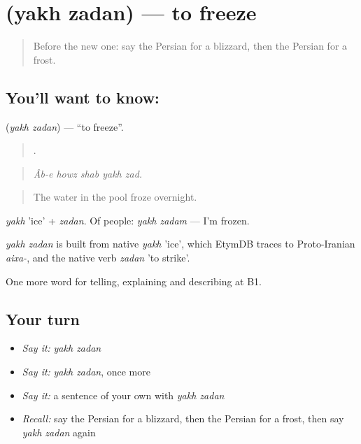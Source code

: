 \section[\texorpdfstring{\fa{یخ} \fa{زدن} (yakh zadan)}{یخ زدن (yakh zadan)}]{  (yakh zadan) — to freeze}

\label{lesson:FA-C476-yakh-zadan}



\begin{quote}
Before the new one: say the Persian for a blizzard, then the Persian for a frost.
\end{quote}

\subsection*{You'll want to know:  }
\textbf{ } (\emph{yakh zadan}) — \textquotedblleft{}to freeze\textquotedblright{}.

\begin{quote}
    .
\end{quote}

\begin{quote}
\emph{Âb-e howz shab yakh zad.}
\end{quote}

\begin{quote}
The water in the pool froze overnight.
\end{quote}

\emph{yakh} 'ice' + \emph{zadan}. Of people: \emph{yakh zadam} — I'm frozen.

\begin{cousinweb}
\emph{yakh zadan} is built from native \emph{yakh} 'ice', which EtymDB traces to Proto-Iranian \emph{aixa-}, and the native verb \emph{zadan} 'to strike'.
\end{cousinweb}

\begin{grammarlens}[title={What you've built}]
One more word for telling, explaining and describing at B1.
\end{grammarlens}

\subsection*{Your turn}
\begin{itemize}
\raggedright
  \item \emph{Say it:} \emph{yakh zadan}
  \item \emph{Say it:} \emph{yakh zadan}, once more
  \item \emph{Say it:} a sentence of your own with \emph{yakh zadan}
  \item \emph{Recall:} say the Persian for a blizzard, then the Persian for a frost, then say \emph{yakh zadan} again
\end{itemize}

